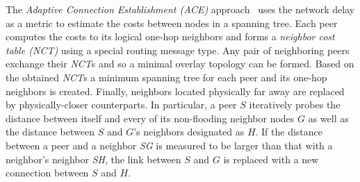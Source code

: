 The \emph{Adaptive Connection Establishment (ACE)} 
approach~\cite{LZXN2004} uses the network delay as a metric 
to estimate the costs between nodes in a spanning tree.
Each peer computes the costs to its logical one-hop
neighbors and forms a \emph{neighbor cost table (NCT)} 
using a special routing message type. 
Any pair of neighboring peers exchange their \emph{NCT}s 
and so a minimal overlay topology can be formed.
Based on the obtained \emph{NCT}s a minimum spanning tree
for each peer and its one-hop neighbors is created.
Finally, neighbors located physically far away 
are replaced by physically-closer counterparts. 
In particular, a peer $S$ iteratively probes the distance between 
itself and every of its non-flooding neighbor nodes $G$  as well as 
the distance between $S$ and $G$'s neighbors designated as $H$.
If the distance between a peer and a neighbor \emph{SG} is measured to 
be larger than that with a neighbor's neighbor \emph{SH}, the link 
between $S$ and $G$ is replaced with a new connection between $S$ and $H$.
